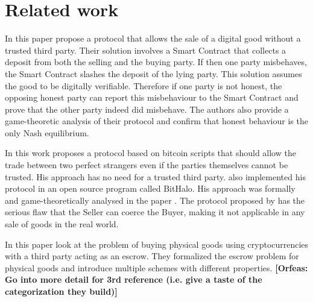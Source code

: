 \documentclass{cacthesis}
\newcommand{\authnote}[3]{{ \footnotesize \textbf{#1[#2: #3]~}}}
\newcommand{\orfnote}[1]{\authnote{\color{blue}}{Orfeas}{#1}}
\begin{document}
\section{Related work}
In this paper \citeauthor{asgaonkar_solving_2019} propose a protocol that allows the sale of a digital good without a trusted third party. Their solution involves a Smart Contract that collects a deposit from both the selling and the buying party. If then one party misbehaves, the Smart Contract slashes the deposit of the lying party.  This solution assumes the good to be digitally verifiable. Therefore if one party is not honest, the opposing honest party can report this misbehaviour to the Smart Contract and prove that the other party indeed did misbehave. The authors also provide a game-theoretic analysis of their protocol and confirm that honest behaviour is the only Nash equilibrium.\newline

In this work \citeauthor{zimbeck_two_nodate} proposes a protocol based on bitcoin scripts that should allow the trade between two perfect strangers even if the parties themselves cannot be trusted. His approach has no need for a trusted third party. \citeauthor{zimbeck_two_nodate} also implemented his protocol in an open source program called BitHalo. His approach was formally and game-theoretically analysed in the paper \cite{bodei_validation_2015}. The protocol proposed by \citeauthor{zimbeck_two_nodate} has the serious flaw that the Seller can coerce the Buyer\cite{goharshady_irrationality_2021}, making it not applicable in any sale of goods in the real world.\newline

In this paper \citeauthor{kiayias_escrow_2017} look at the problem of buying physical goods using cryptocurrencies with a third party acting as an escrow. They formalized the escrow problem for physical goods and introduce multiple schemes with different properties.\orfnote{Go into more detail for 3rd reference (i.e. give a taste of the categorization they build)}\newline
\end{document}
